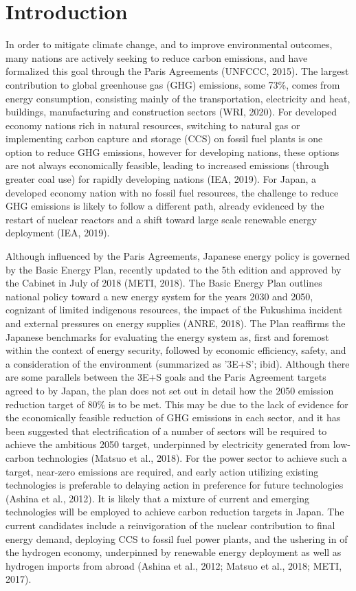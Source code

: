 \section{Introduction} \label{Introduction}
In order to mitigate climate change, and to improve environmental outcomes, many nations are actively seeking to reduce carbon emissions, and have formalized this goal through the Paris Agreements (UNFCCC, 2015). The largest contribution to global greenhouse gas (GHG) emissions, some 73\%, comes from energy consumption, consisting mainly of the transportation, electricity and heat, buildings, manufacturing and construction sectors (WRI, 2020). For developed economy nations rich in natural resources, switching to natural gas or implementing carbon capture and storage (CCS) on fossil fuel plants is one option to reduce GHG emissions, however for developing nations, these options are not always economically feasible, leading to increased emissions (through greater coal use) for rapidly developing nations (IEA, 2019). For Japan, a developed economy nation with no fossil fuel resources, the challenge to reduce GHG emissions is likely to follow a different path, already evidenced by the restart of nuclear reactors and a shift toward large scale renewable energy deployment (IEA, 2019).

Although influenced by the Paris Agreements, Japanese energy policy is governed by the Basic Energy Plan, recently updated to the 5th edition and approved by the Cabinet in July of 2018 (METI, 2018). The Basic Energy Plan outlines national policy toward a new energy system for the years 2030 and 2050, cognizant of limited indigenous resources, the impact of the Fukushima incident and external pressures on energy supplies (ANRE, 2018). The Plan reaffirms the Japanese benchmarks for evaluating the energy system as, first and foremost within the context of energy security, followed by economic efficiency, safety, and a consideration of the environment (summarized as '3E+S'; ibid). Although there are some parallels between the 3E+S goals and the Paris Agreement targets agreed to by Japan, the plan does not set out in detail how the 2050 emission reduction target of 80\% is to be met. This may be due to the lack of evidence for the economically feasible reduction of GHG emissions in each sector, and it has been suggested that electrification of a number of sectors will be required to achieve the ambitious 2050 target, underpinned by electricity generated from low-carbon technologies (Matsuo et al., 2018). For the power sector to achieve such a target, near-zero emissions are required, and early action utilizing existing technologies is preferable to delaying action in preference for future technologies (Ashina et al., 2012). It is likely that a mixture of current and emerging technologies will be employed to achieve carbon reduction targets in Japan. The current candidates include a reinvigoration of the nuclear contribution to final energy demand, deploying CCS to fossil fuel power plants, and the ushering in of the hydrogen economy, underpinned by renewable energy deployment as well as hydrogen imports from abroad (Ashina et al., 2012; Matsuo et al., 2018; METI, 2017). 

